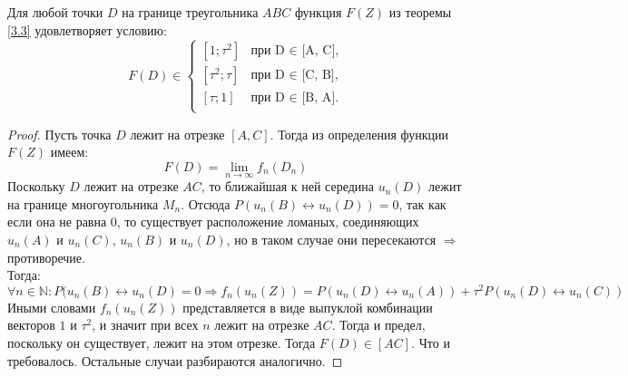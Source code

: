\begin{suggestion} \label{3.4c}
 Для любой точки $D$ на границе треугольника $ABC$ функция $F(Z)$ из теоремы \ref{3.3} удовлетворяет условию: 
 $$
 F(D) \in 
 \begin{cases}
 [1; \tau{}^2] &\text{при D $\in$ [A, C],} \\
 [\tau{}^2; \tau{}] &\text{при D $\in$ [C, B],} \\
 [\tau{}; 1] &\text{при D $\in$ [B, A].} \\
 \end{cases}
 $$
 
\end{suggestion}



\begin{proof}
Пусть точка $D$ лежит на отрезке $[A, C]$. Тогда из определения функции $F(Z)$ имеем:
$$F(D) = \displaystyle \lim_{n\to\infty} {f_n(D_n)}$$
Поскольку $D$ лежит на отрезке $AC$, то ближайшая к ней середина $u_n(D)$ лежит на границе многоугольника $M_n$. Отсюда $P(u_n(B) \leftrightarrow u_n(D)) = 0$, так как если она не равна 0, то существует расположение ломаных, соединяющих $u_n(A)$ и $u_n(C)$, $u_n(B)$ и $u_n(D)$, но в таком случае они пересекаются $ \Rightarrow$ противоречие.
\\
Тогда: $\forall n \in \mathbb{N}: P(u_n(B) \leftrightarrow u_n(D) = 0 \Rightarrow f_n(u_n(Z))=P(u_n(D) \leftrightarrow u_n(A)) + {\tau{}^2}P(u_n(D) \leftrightarrow u_n(C))$
\\
Иными словами $f_n(u_n(Z))$ представляется в виде выпуклой комбинации векторов $1$ и $\tau{}^2$, и значит при всех $n$ лежит на отрезке $AC$. Тогда и предел, поскольку он существует, лежит на этом отрезке. Тогда $F(D) \in [AC]$. Что и требовалось. Остальные случаи разбираются аналогично.
\end{proof}